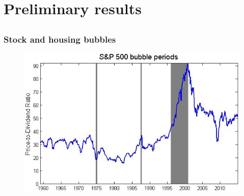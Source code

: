 \documentclass [handout] {beamer} %
\begin{document}

\section{Preliminary results}
\subsection{}

\begin{frame}
\frametitle{Stock and housing bubbles}
\begin{figure}[htb]
  \centering
    \includegraphics[width=\textwidth]{sp500bubble.jpg}
\end{figure}
\end{frame}
\end{document}
